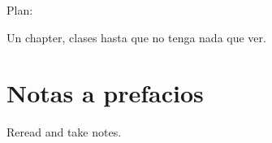 Plan:

Un chapter, clases hasta que no tenga nada que ver.

\section{Notas a prefacios}

Reread and take notes.
